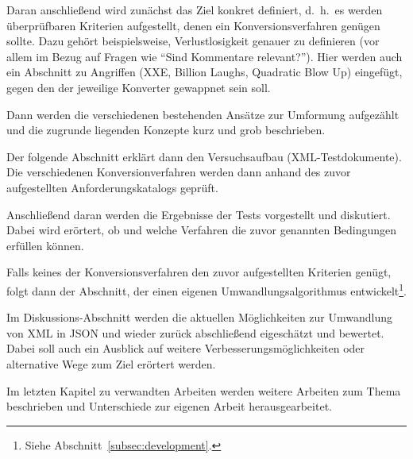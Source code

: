\documentclass[conference]{template/IEEEtran}
\begin{document}
Daran anschließend wird zunächst das Ziel konkret definiert, d.~h.\ es werden
überprüfbaren Kriterien aufgestellt, denen ein Konversionsverfahren genügen
sollte. Dazu gehört beispielsweise, Verlustlosigkeit genauer zu definieren (vor
allem im Bezug auf Fragen wie \enquote{Sind Kommentare relevant?}). Hier werden
auch ein Abschnitt zu Angriffen (XXE, Billion Laughs, Quadratic Blow Up)
eingefügt, gegen den der jeweilige Konverter gewappnet sein soll.

Dann werden die verschiedenen bestehenden Ansätze zur Umformung aufgezählt
und die zugrunde liegenden Konzepte kurz und grob beschrieben.

Der folgende Abschnitt erklärt dann den Versuchsaufbau (XML-Testdokumente).
Die verschiedenen Konversionverfahren werden dann anhand des zuvor
aufgestellten Anforderungskatalogs geprüft.

Anschließend daran werden die Ergebnisse der Tests vorgestellt und diskutiert.
Dabei wird erörtert, ob und welche Verfahren die zuvor genannten Bedingungen
erfüllen können.

Falls keines der Konversionsverfahren den zuvor aufgestellten Kriterien genügt,
folgt dann der Abschnitt, der einen eigenen Umwandlungsalgorithmus
entwickelt\footnote{Siehe Abschnitt~\ref{subsec:development}.}.

Im Diskussions-Abschnitt werden die aktuellen Möglichkeiten zur Umwandlung
von XML in JSON und wieder zurück abschließend eigeschätzt und bewertet.
Dabei soll auch ein Ausblick auf weitere Verbesserungsmöglichkeiten oder
alternative Wege zum Ziel erörtert werden.

Im letzten Kapitel zu verwandten Arbeiten werden weitere Arbeiten zum Thema
beschrieben und Unterschiede zur eigenen Arbeit herausgearbeitet.


\ifCLASSOPTIONcaptionsoff{}
  \newpage
\fi
\printbibliography{}
\end{document}
